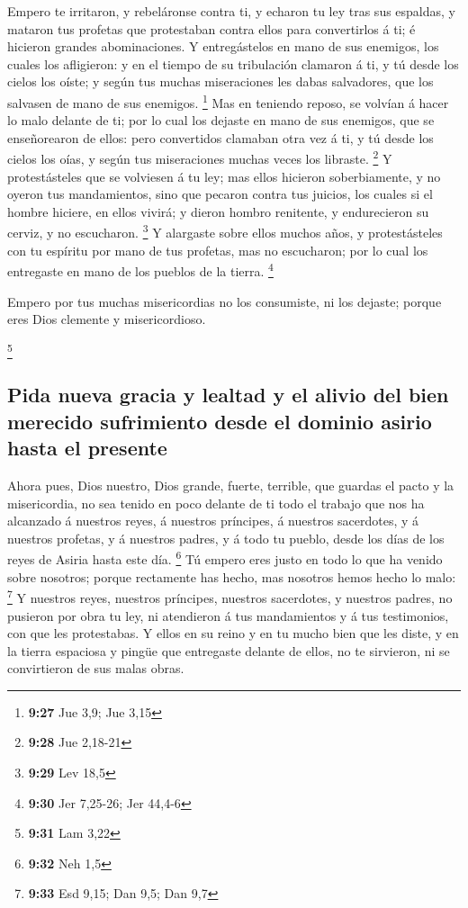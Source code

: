  Empero te irritaron, y rebeláronse contra ti, y echaron tu
ley tras sus espaldas, y mataron tus profetas que protestaban contra
ellos para convertirlos á ti; é hicieron grandes abominaciones.
 Y entregástelos en mano de sus enemigos, los cuales los
afligieron: y en el tiempo de su tribulación clamaron á ti, y tú desde
los cielos los oíste; y según tus muchas miseraciones les dabas
salvadores, que los salvasen de mano de sus enemigos. \footnote{\textbf{9:27}
  Jue 3,9; Jue 3,15}  Mas en teniendo reposo, se volvían á
hacer lo malo delante de ti; por lo cual los dejaste en mano de sus
enemigos, que se enseñorearon de ellos: pero convertidos clamaban otra
vez á ti, y tú desde los cielos los oías, y según tus miseraciones
muchas veces los libraste. \footnote{\textbf{9:28} Jue 2,18-21}
 Y protestásteles que se volviesen á tu ley; mas ellos
hicieron soberbiamente, y no oyeron tus mandamientos, sino que pecaron
contra tus juicios, los cuales si el hombre hiciere, en ellos vivirá; y
dieron hombro renitente, y endurecieron su cerviz, y no escucharon.
\footnote{\textbf{9:29} Lev 18,5}  Y alargaste sobre ellos
muchos años, y protestásteles con tu espíritu por mano de tus profetas,
mas no escucharon; por lo cual los entregaste en mano de los pueblos de
la tierra. \footnote{\textbf{9:30} Jer 7,25-26; Jer 44,4-6}

 Empero por tus muchas misericordias no los consumiste, ni
los dejaste; porque eres Dios clemente y misericordioso.

\footnote{\textbf{9:31} Lam 3,22}

\hypertarget{pida-nueva-gracia-y-lealtad-y-el-alivio-del-bien-merecido-sufrimiento-desde-el-dominio-asirio-hasta-el-presente}{%
\subsection{Pida nueva gracia y lealtad y el alivio del bien merecido
sufrimiento desde el dominio asirio hasta el
presente}\label{pida-nueva-gracia-y-lealtad-y-el-alivio-del-bien-merecido-sufrimiento-desde-el-dominio-asirio-hasta-el-presente}}

 Ahora pues, Dios nuestro, Dios grande, fuerte, terrible,
que guardas el pacto y la misericordia, no sea tenido en poco delante de
ti todo el trabajo que nos ha alcanzado á nuestros reyes, á nuestros
príncipes, á nuestros sacerdotes, y á nuestros profetas, y á nuestros
padres, y á todo tu pueblo, desde los días de los reyes de Asiria hasta
este día. \footnote{\textbf{9:32} Neh 1,5}  Tú empero eres
justo en todo lo que ha venido sobre nosotros; porque rectamente has
hecho, mas nosotros hemos hecho lo malo: \footnote{\textbf{9:33} Esd
  9,15; Dan 9,5; Dan 9,7}  Y nuestros reyes, nuestros
príncipes, nuestros sacerdotes, y nuestros padres, no pusieron por obra
tu ley, ni atendieron á tus mandamientos y á tus testimonios, con que
les protestabas.  Y ellos en su reino y en tu mucho bien
que les diste, y en la tierra espaciosa y pingüe que entregaste delante
de ellos, no te sirvieron, ni se convirtieron de sus malas obras.

